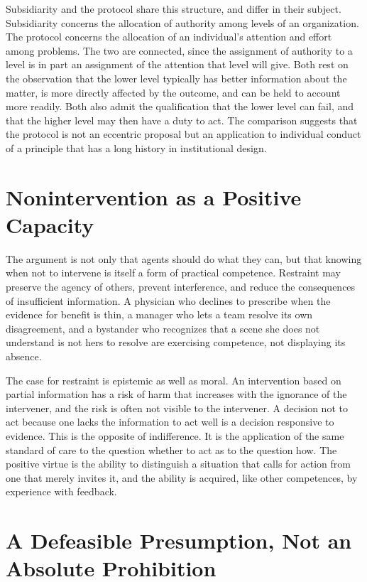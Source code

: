 \documentclass[11pt]{report}
\theoremstyle{definition}
\theoremstyle{remark}
\begin{document}
Subsidiarity and the protocol share this structure, and differ in their subject. Subsidiarity concerns the allocation of authority among levels of an organization. The protocol concerns the allocation of an individual's attention and effort among problems. The two are connected, since the assignment of authority to a level is in part an assignment of the attention that level will give. Both rest on the observation that the lower level typically has better information about the matter, is more directly affected by the outcome, and can be held to account more readily. Both also admit the qualification that the lower level can fail, and that the higher level may then have a duty to act. The comparison suggests that the protocol is not an eccentric proposal but an application to individual conduct of a principle that has a long history in institutional design.

\section{Nonintervention as a Positive Capacity}

The argument is not only that agents should do what they can, but that knowing when not to intervene is itself a form of practical competence. Restraint may preserve the agency of others, prevent interference, and reduce the consequences of insufficient information. A physician who declines to prescribe when the evidence for benefit is thin, a manager who lets a team resolve its own disagreement, and a bystander who recognizes that a scene she does not understand is not hers to resolve are exercising competence, not displaying its absence.

The case for restraint is epistemic as well as moral. An intervention based on partial information has a risk of harm that increases with the ignorance of the intervener, and the risk is often not visible to the intervener. A decision not to act because one lacks the information to act well is a decision responsive to evidence. This is the opposite of indifference. It is the application of the same standard of care to the question whether to act as to the question how. The positive virtue is the ability to distinguish a situation that calls for action from one that merely invites it, and the ability is acquired, like other competences, by experience with feedback.

\section{A Defeasible Presumption, Not an Absolute Prohibition}
\end{document}
